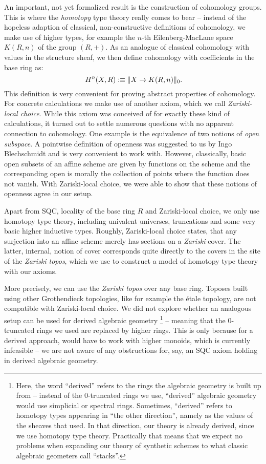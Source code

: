 \documentclass{../util/zariski}
\begin{document}
An important, not yet formalized result
is the construction of cohomology groups.
This is where the \emph{homotopy} type theory really comes to bear --
instead of the hopeless adaption of classical, non-constructive definitions of cohomology,
we make use of higher types,
for example the $n$-th Eilenberg-MacLane space $K(R,n)$ of the group $(R,+)$.
As an analogue of classical cohomology with values in the structure sheaf,
we then define cohomology with coefficients in the base ring as:
\[
  H^n(X,R):\equiv \|X\to K(R,n)\|_0
  \rlap{.}
\]
This definition is very convenient for proving abstract properties of cohomology.
For concrete calculations we make use of another axiom,
which we call \emph{Zariski-local choice}.
While this axiom was conceived of for exactly these kind of calculations,
it turned out to settle numerous questions with no apparent connection to cohomology.
One example is the equivalence of two notions of \emph{open subspace}.
A pointwise definition of openness was suggested to us by Ingo Blechschmidt and
is very convenient to work with.
However, classically, basic open subsets of an affine scheme are given
by functions on the scheme and the corresponding open is morally the collection of points where the function does not vanish.
With Zariski-local choice, we were able to show that these notions of openness agree in our setup.

Apart from SQC, locality of the base ring $R$ and Zariski-local choice,
we only use homotopy type theory, including univalent universes, truncations and some very basic higher inductive types.
Roughly, Zariski-local choice states, that any surjection into an affine scheme merely has sections on a \emph{Zariski}-cover.
The latter, internal, notion of cover corresponds quite directly to the covers in the site of the \emph{Zariski topos},
which we use to construct a model of homotopy type theory with our axioms.

More precisely, we can use the \emph{Zariski topos} over any base ring.
Toposes built using other Grothendieck topologies, like for example the étale topology, are not compatible with Zariski-local choice.
We did not explore whether an analogous setup can be used for derived algebraic geometry
\footnote{Here, the word ``derived'' refers to the rings the algebraic geometry is built up from -- instead of the 0-truncated rings we use, ``derived'' algebraic geometry would use simplicial or spectral rings.
  Sometimes, ``derived'' refers to homotopy types appearing in ``the other direction'', namely as the values of the sheaves that used.
  In that direction, our theory is already derived, since we use homotopy type theory.
  Practically that means that we expect no problems when expanding our theory of synthetic schemes to what classic algebraic geometers
  call ``stacks''.
}
-- meaning that the 0-truncated rings we used are replaced by higher rings.
This is only because for a derived approach, would have to work with higher monoids, which is currently infeasible
-- we are not aware of any obstructions for, say, an SQC axiom holding in derived algebraic geometry.
\end{document}
